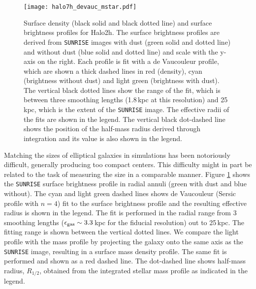 \documentclass[useAMS,usenatbib]{mnras}
\begin{document}
\begin{figure}
  \centering
 \texttt{[image: halo7h\_devauc\_mstar.pdf]}
  \caption{{Surface density (black solid and black dotted line) and
    surface brightness profiles for Halo2h. The surface brightness profiles are derived from
    \texttt{SUNRISE} images with dust (green solid and dotted line)
    and without dust (blue solid and dotted line) and
    scale with the y-axis on the right.  Each profile is fit with a de
    Vaucouleur profile, which are shown a thick dashed lines in red (density),
    cyan (brightness without dust) and light green (brightness with dust). The vertical black dotted
    lines show the range of the fit, which is between three smoothing
    lengths (1.8\,kpc at this resolution) and 25\,kpc, which is the extent of the \texttt{SUNRISE}
    image. The effective radii of the fits are shown in
    the legend. The vertical black dot-dashed line shows the position
    of the half-mass radius derived through integration and its value
    is also shown in the legend.}}
  \label{fig:profile}
\end{figure}

Matching the sizes of elliptical galaxies in simulations has been
notoriously difficult, generally producing too compact centers. This
difficulty might in part be related to the task of measuring the size
in a comparable manner.  {Figure \ref{fig:profile} shows the
\texttt{SUNRISE} surface brightness profile in radial annuli (green
with dust
and blue without). The cyan and light green dashed
lines shows de Vaucouleur (Sersic profile with $n=4$) fit to the
surface brightness profile and the resulting effective radius is shown
in the legend. The fit is performed in the radial range from 3
smoothing lengths ($\epsilon_{\rm gas}\sim 3.3\,$kpc for the fiducial
resolution) out to 25\,kpc. The fitting range is shown between the
vertical dotted lines. We compare the light profile with the
mass profile by projecting the galaxy onto the same axis as the
\texttt{SUNRISE} image, resulting in a surface mass density
profile. The same fit is performed and shown as a red dashed line.
The dot-dashed line shows half-mass radius, $R_{1/2}$, obtained from the 
integrated stellar mass profile as indicated in the legend.}

%
\end{document}
